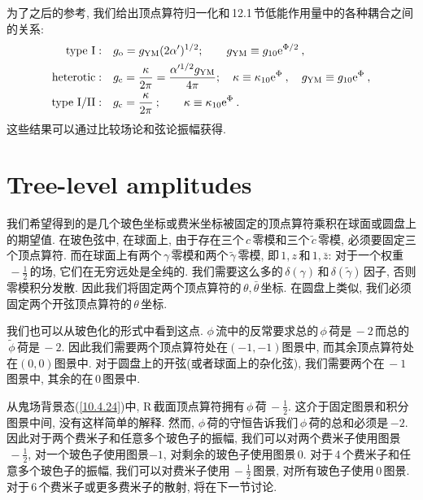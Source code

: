为了之后的参考, 我们给出顶点算符归一化和\,12.1\,节低能作用量中的各种耦合之间的关系:
\begin{subequations}
\begin{align}
    \text{type I}:&\quad g_{\mathrm{o}}=g_{\mathrm{YM}}(2\alpha^{\prime})^{1/2}; \qquad 
    g_{\mathrm{YM}}\equiv g_{10}\mathrm{e}^{\Phi/2} \:, \label{12.3.47a} \\
    \text{heterotic}:&\quad g_{\mathrm{c}}=\frac{\kappa}{2\pi}=\frac{\alpha^{\prime1/2}g_{\mathrm{YM}}}{4\pi};
    \quad \kappa\equiv \kappa_{10}\mathrm{e}^{\Phi}\:,\quad g_{\mathrm{YM}}\equiv g_{10}\mathrm{e}^{\Phi}\:,\label{12.3.47b} \\
    \text{type I/II}:&\quad g_{\mathrm{c}}=\frac{\kappa}{2\pi}\:; \qquad \kappa\equiv \kappa_{10}\mathrm{e}^{\Phi}\:.\label{12.3.47c} 
\end{align} \label{12.3.47}
\end{subequations}
这些结果可以通过比较场论和弦论振幅获得. 



\section{Tree-level amplitudes}

我们希望得到的是几个玻色坐标或费米坐标被固定的顶点算符乘积在球面或圆盘上的期望值. 在玻色弦中, 在球面上, 由于存在三个$\,c\,$零模和三个$\,\tilde{c}\,$零模, 必须要固定三个顶点算符. 而在球面上有两个$\,\gamma\,$零模和两个$\,\tilde{\gamma}\,$零模, 即$\,1,z\,$和$\,1,\bar{z}$: 对于一个权重$\,-\frac{1}{2}\,$的场, 它们在无穷远处是全纯的. 我们需要这么多的$\,\delta(\gamma)\,$和$\,\delta(\tilde{\gamma})\,$因子, 否则零模积分发散. 因此我们将固定两个顶点算符的$\,\theta,\bar{\theta}\,$坐标. 在圆盘上类似, 我们必须固定两个开弦顶点算符的$\,\theta\,$坐标.

我们也可以从玻色化的形式中看到这点. $\phi\,$流中的反常要求总的$\,\phi\,$荷是$\,-2\,$而总的$\,\tilde{\phi}\,$荷是$\,-2$. 因此我们需要两个顶点算符处在$(-1,-1)$图景中, 而其余顶点算符处在$(0,0)$图景中. 对于圆盘上的开弦(或者球面上的杂化弦), 我们需要两个在$\,-1\,$图景中, 其余的在$\,0\,$图景中.

从鬼场背景态(\ref{10.4.24})中, R\,截面顶点算符拥有$\,\phi\,$荷$\,-\tfrac{1}{2}$. 这介于固定图景和积分图景中间, 没有这样简单的解释. 然而, $\phi\,$荷的守恒告诉我们$\,\phi\,$荷的总和必须是\,$-2$. 因此对于两个费米子和任意多个玻色子的振幅, 我们可以对两个费米子使用图景$\,-\tfrac{1}{2}$, 对一个玻色子使用图景$-1$, 对剩余的玻色子使用图景$\,0$. 对于\,4\,个费米子和任意多个玻色子的振幅, 我们可以对费米子使用$\,-\frac{1}{2}\,$图景, 对所有玻色子使用$\,0\,$图景. 对于\,6\,个费米子或更多费米子的散射, 将在下一节讨论.

